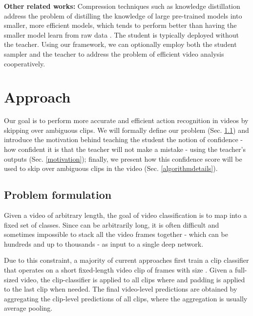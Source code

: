 \documentclass[a4paper,conference]{IEEEtran}
\begin{document}
{\bf Other related works:}
Compression techniques such as knowledge distillation \cite{bucilua2006model, hinton2015distilling, urban2016deep} address the problem of distilling the knowledge of large pre-trained models into smaller, more efficient models, which tends to perform better than having the smaller model learn from raw data \cite{furlanello2018born, cheng2020explaining}. The student is typically deployed without the teacher. Using our framework, we can optionally employ both the student sampler and the teacher to address the problem of efficient video analysis cooperatively. 

\section{Approach}
\label{approach}

Our goal is to perform more accurate and efficient action recognition in videos by skipping over ambiguous clips. We will formally define our problem (Sec. \ref{problemformulation}) and introduce the motivation behind teaching the student the notion of confidence - how confident it is that the teacher will not make a mistake - using the teacher's outputs (Sec. \ref{motivation}); finally, we present how this confidence score will be used to skip over ambiguous clips in the video (Sec. \ref{algorithmdetails}).

\subsection{Problem formulation}
\label{problemformulation}

Given a video  of arbitrary length, the goal of video classification is to map  into a fixed set of  classes. Since  can be arbitrarily long, it is often difficult and sometimes impossible to stack all the video frames together - which can be hundreds and up to thousands - as input to a single deep network.

Due to this constraint, a majority of current approaches \cite{simonyan2014two, tran2015learning, carreira2017quo, tran2018closer, wang2018non, feichtenhofer2019slowfast} first train a clip classifier  that operates on a short fixed-length video clip of  frames with size . Given a full-sized video, the clip-classifier is applied to all  clips  where  and padding is applied to the last clip when needed. The final video-level predictions are obtained by aggregating the clip-level predictions of all  clips, where the aggregation is usually average pooling.
\end{document}
